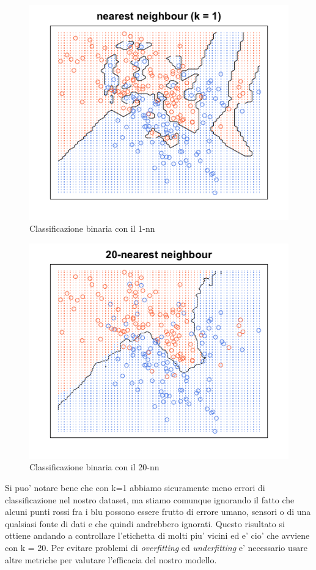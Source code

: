 \begin{figure}[H]
	\centering
	\includegraphics[width=0.7\linewidth]{img/1nearestneigh}
	\caption{Classificazione binaria con il 1-nn}
	\label{fig:1nearestneigh}
\end{figure}

\begin{figure}[H]
	\centering
	\includegraphics[width=0.7\linewidth]{img/20nearestneigh}
	\caption{Classificazione binaria con il 20-nn}
	\label{fig:20nearestneigh}
\end{figure}

Si puo' notare bene che con k=1 abbiamo sicuramente meno errori di classificazione nel nostro dataset, ma stiamo comunque ignorando il fatto che alcuni punti rossi fra i blu possono essere frutto di errore umano, sensori o di una qualsiasi fonte di dati e che quindi andrebbero ignorati. Questo risultato si ottiene andando a controllare l'etichetta di molti piu' vicini ed e' cio' che avviene con k = 20.
Per evitare problemi di \textit{overfitting} ed \textit{underfitting} e' necessario usare altre metriche per valutare l'efficacia del nostro modello.

